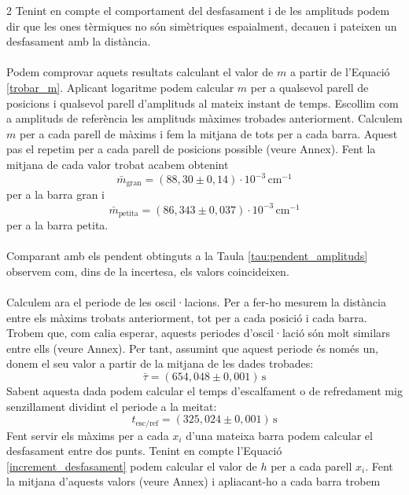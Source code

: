 \documentclass[12pt,twosides,onecolumn,openany]{article}
\begin{document}
\begin{multicols}{2}
Tenint en compte el comportament del desfasament i de les amplituds podem dir que les ones tèrmiques no són simètriques espaialment, decauen i pateixen un desfasament amb la distància.\\\\
Podem comprovar aquets resultats calculant el valor de $m$ a partir de l'Equació \ref{trobar_m}. Aplicant logaritme podem calcular $m$ per a qualsevol parell de posicions i qualsevol parell d'amplituds al mateix instant de temps. Escollim com a amplituds de referència les amplituds màximes trobades anteriorment. Calculem $m$ per a cada parell de màxims i fem la mitjana de tots per a cada barra. Aquest pas el repetim per a cada parell de posicions possible (veure Annex). Fent la mitjana de cada valor trobat acabem obtenint
\begin{equation*}
  \bar{m}_{\text{gran}} = (88,30\pm0,14)\cdot 10^{-3} \, \text{cm}^{-1}
\end{equation*}
per a la barra gran i
\begin{equation*}
  \bar{m}_{\text{petita}} = (86,343\pm0,037)\cdot 10^{-3} \, \text{cm}^{-1}
\end{equation*} 
per a la barra petita.\\\\
Comparant amb els pendent obtinguts a la Taula \ref{tau:pendent_amplituds} observem com, dins de la incertesa, els valors coincideixen.\\\\
Calculem ara el periode de les oscil·lacions. Per a fer-ho mesurem la distància entre els màxims trobats anteriorment, tot per a cada posició i cada barra. Trobem que, com calia esperar, aquests periodes d'oscil·lació són molt similars entre ells (veure Annex). Per tant, assumint que aquest periode és només un, donem el seu valor a partir de la mitjana de les dades trobades:
\begin{equation*}
  \bar{\tau} = (654,048\pm0,001) \, \text{s}
\end{equation*}
Sabent aquesta dada podem calcular el temps d'escalfament o de refredament mig senzillament dividint el periode a la meitat:
\begin{equation*}
  t_{\text{esc/ref}} = (325,024\pm0,001) \, \text{s}
\end{equation*}
Fent servir els màxims per a cada $x_i$ d'una mateixa barra podem calcular el desfasament entre dos punts. Tenint en compte l'Equació \eqref{increment_desfasament} podem calcular el valor de $h$ per a cada parell $x_i$. Fent la mitjana d'aquests valors (veure Annex) i apliacant-ho a cada barra trobem

\end{multicols}
\end{document}
